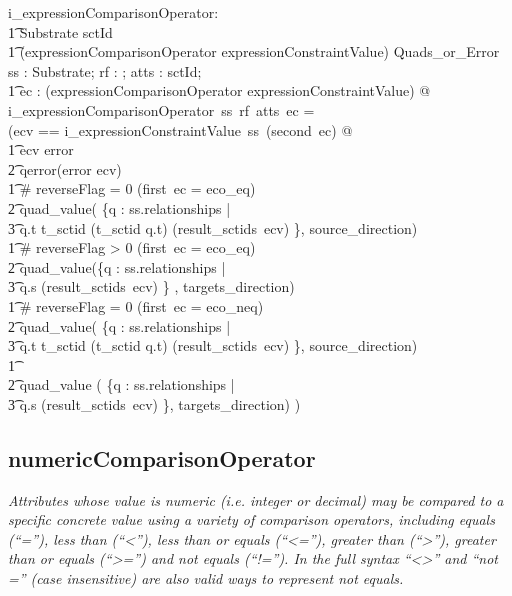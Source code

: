 \documentclass{article}
\def\desc#1{{\small \textsl{{#1}} }}
\begin{document}
\begin{axdef}
   i\_expressionComparisonOperator: \\
\t1 Substrate \fun \optional[reverseFlag] \fun \power sctId \fun \\
\t1 (expressionComparisonOperator \cross expressionConstraintValue) \fun Quads\_or\_Error
\where
    \forall ss : Substrate; rf : \optional[reverseFlag]; atts : \power sctId; \\
\t1 ec : (expressionComparisonOperator \cross expressionConstraintValue)  @ \\
    i\_expressionComparisonOperator~ss~rf~atts~ec = \\
    (\LET ecv == i\_expressionConstraintValue~ss~(second~ec) @ \\
\t1 \IF ecv \in \ran error \THEN \\
\t2 qerror(error \inv ecv) \\
\t1 \ELSE \IF \# reverseFlag = 0 \land (first~ec =  eco\_eq) \THEN \\
\t2 quad\_value( \{q : ss.relationships | \\
\t3 q.t \in \ran t\_sctid \land (t\_sctid \inv q.t) \in (result\_sctids~ecv) \}, source\_direction) \\
\t1 \ELSE \IF \# reverseFlag > 0  \land (first~ec =  eco\_eq) \THEN \\
\t2 quad\_value(\{q : ss.relationships | \\
\t3 q.s \in (result\_sctids~ecv) \} , targets\_direction) \\
\t1  \ELSE \IF \# reverseFlag = 0  \land (first~ec =  eco\_neq) \THEN \\
\t2 quad\_value( \{q : ss.relationships | \\
\t3 q.t \in \ran t\_sctid \land (t\_sctid \inv q.t) \notin (result\_sctids~ecv) \}, source\_direction) \\
\t1 \ELSE \\
\t2 quad\_value ( \{q : ss.relationships | \\
\t3 q.s \notin (result\_sctids~ecv) \}, targets\_direction) )
 \end{axdef}
 
 \subsection{numericComparisonOperator}
\begin{framed}
\desc{Attributes whose value is numeric (i.e. integer or decimal) may be compared to a specific concrete value using a variety of comparison operators, including equals (``=''), less than (``\textless''), less than or equals (``\textless=''), greater than (``\textgreater''), greater than or equals (``\textgreater='') and not equals (``!=''). In the full syntax ``\textless\textgreater'' and ``not ='' (case insensitive) are also valid ways to represent not equals.}
\end{framed}
\end{document}
